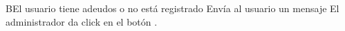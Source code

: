 		\begin{UCtrayectoriaA}{B}{El usuario tiene adeudos o no está registrado}
			\UCpaso[\UCsist] Envía al usuario un mensaje 
			\UCpaso[\UCsist] El administrador da click en el botón .
		\end{UCtrayectoriaA}
		







%
%
%
%
%
%
%
%
%
%
%
%
%
%
%
%
%
%
%




















